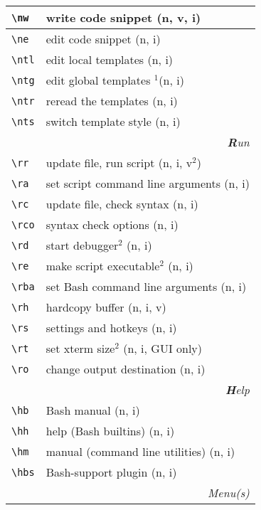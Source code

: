 \documentclass[oneside,11pt,a4paper,DIV18]{scrartcl}
\begin{document}
\begin{center}
\begin{tabular}[]{|p{11mm}|p{59mm}|}
\hline \verb'\nw'  & write code snippet         \hfill (n, v, i)\\
\hline \verb'\ne'  & edit code snippet          \hfill (n, i)\\
%
\hline \verb'\ntl' & edit local templates      \hfill (n, i)\\
\hline \verb'\ntg' & edit global templates $^1$\hfill (n, i)\\
\hline \verb'\ntr' & reread the templates      \hfill (n, i)\\
\hline \verb'\nts' & switch template style     \hfill (n, i)\\
\hline
\hline
\multicolumn{2}{|r|}{\textsl{\textbf{R}un}}\\
\hline \verb'\rr'  & update file, run script           \hfill (n, i, v$^2$)\\
\hline \verb'\ra'  & set script command line arguments \hfill (n, i)\\
\hline \verb'\rc'  & update file, check syntax         \hfill (n, i)\\
\hline \verb'\rco' & syntax check options              \hfill (n, i)\\
\hline \verb'\rd'  & start debugger$^2$                \hfill (n, i)\\
\hline \verb'\re'  & make script executable$^2$        \hfill (n, i)\\
\hline \verb'\rba' & set Bash command line arguments   \hfill (n, i)\\
\hline \verb'\rh'  & hardcopy buffer                   \hfill (n, i, v)\\
\hline \verb'\rs'  & settings and hotkeys              \hfill (n, i)\\
\hline \verb'\rt'  & set xterm size$^2$                \hfill (n, i, GUI only)\\
\hline \verb'\ro'  & change output destination         \hfill (n, i)\\
\hline
\hline 
\multicolumn{2}{|r|}{\textsl{\textbf{H}elp}}\\
\hline \verb'\hb'  & Bash manual                     \hfill (n, i)\\
\hline \verb'\hh'  & help (Bash builtins)            \hfill (n, i)\\
\hline \verb'\hm'  & manual (command line utilities) \hfill (n, i)\\
\hline \verb'\hbs' & Bash-support plugin             \hfill (n, i)\\
\hline 
\hline
\multicolumn{2}{|r|}{\textsl{Menu(s)}}\\

\end{tabular}
\end{center}
\end{document}
